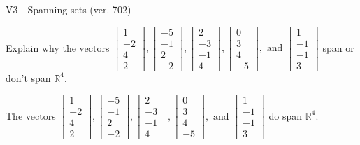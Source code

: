 \begin{exercise}
  \begin{exerciseTitle}V3 - Spanning sets (ver. 702)\end{exerciseTitle}
  \begin{exerciseStatement}
    Explain why the vectors \(\left[\begin{array}{r}
1 \\
-2 \\
4 \\
2
\end{array}\right] , \left[\begin{array}{r}
-5 \\
-1 \\
2 \\
-2
\end{array}\right] , \left[\begin{array}{r}
2 \\
-3 \\
-1 \\
4
\end{array}\right] , \left[\begin{array}{r}
0 \\
3 \\
4 \\
-5
\end{array}\right] , \text{ and } \left[\begin{array}{r}
1 \\
-1 \\
-1 \\
3
\end{array}\right]\) span or don't span \(\mathbb{R}^4\). 
	


  \end{exerciseStatement}
  \begin{exerciseAnswer}
   The vectors \(\left[\begin{array}{r}
1 \\
-2 \\
4 \\
2
\end{array}\right] , \left[\begin{array}{r}
-5 \\
-1 \\
2 \\
-2
\end{array}\right] , \left[\begin{array}{r}
2 \\
-3 \\
-1 \\
4
\end{array}\right] , \left[\begin{array}{r}
0 \\
3 \\
4 \\
-5
\end{array}\right] , \text{ and } \left[\begin{array}{r}
1 \\
-1 \\
-1 \\
3
\end{array}\right]\) 
  	 do  
	span \(\mathbb{R}^4\).
  



\end{exerciseAnswer}
\end{exercise}
